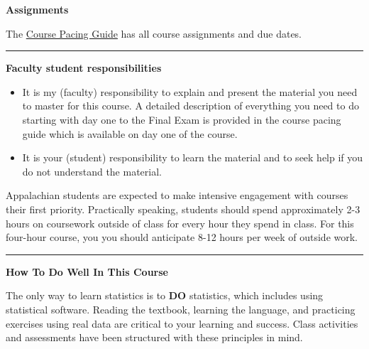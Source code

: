 \documentclass[
]{article}
\begin{document}
\textbf{Assignments}

The \href{../CoursePacing/CoursePacingF2024.html}{Course Pacing Guide}
has all course assignments and due dates.

\begin{center}\rule{0.5\linewidth}{0.5pt}\end{center}

\begin{rmdnote}
\textbf{Faculty student responsibilities}

\begin{itemize}
\item
  It is my (faculty) responsibility to explain and present the material
  you need to master for this course. A detailed description of
  everything you need to do starting with day one to the Final Exam is
  provided in the course pacing guide which is available on day one of
  the course.
\item
  It is your (student) responsibility to learn the material and to seek
  help if you do not understand the material.
\end{itemize}
\end{rmdnote}

Appalachian students are expected to make intensive engagement with
courses their first priority. Practically speaking, students should
spend approximately 2-3 hours on coursework outside of class for every
hour they spend in class. For this four-hour course, you you should
anticipate 8-12 hours per week of outside work.

\begin{center}\rule{0.5\linewidth}{0.5pt}\end{center}

\textbf{How To Do Well In This Course}

The only way to learn statistics is to \textbf{DO} statistics, which
includes using statistical software. Reading the textbook, learning the
language, and practicing exercises using real data are critical to your
learning and success. Class activities and assessments have been
structured with these principles in mind.
\end{document}
